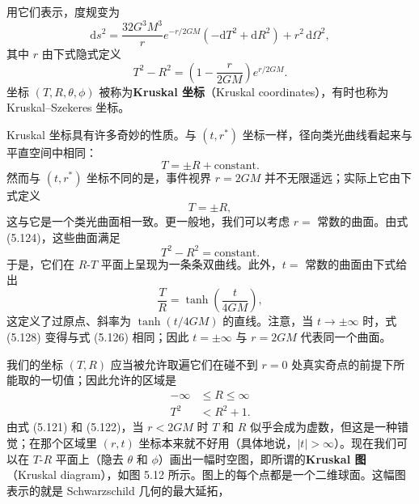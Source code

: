 用它们表示，度规变为
\begin{equation*}
\boxed{\,\mathrm{d}s^2 = \frac{32G^3M^3}{r}e^{-r/2GM}\left(-\mathrm{d}T^2 + \mathrm{d}R^2\right) + r^2\,\mathrm{d}\Omega^2,\,}
\tag{5.123}
\end{equation*}
其中 $r$ 由下式隐式定义
\begin{equation*}
T^2 - R^2 = \left(1 - \frac{r}{2GM}\right)e^{r/2GM}.
\tag{5.124}
\end{equation*}
坐标 $(T, R, \theta, \phi)$ 被称为\textbf{Kruskal 坐标}（Kruskal coordinates），有时也称为 Kruskal--Szekeres 坐标。

Kruskal 坐标具有许多奇妙的性质。与 $(t, r^*)$ 坐标一样，径向类光曲线看起来与平直空间中相同：
\begin{equation*}
T = \pm R + \text{constant}.
\tag{5.125}
\end{equation*}
然而与 $(t, r^*)$ 坐标不同的是，事件视界 $r = 2GM$ 并不无限遥远；实际上它由下式定义
\begin{equation*}
T = \pm R,
\tag{5.126}
\end{equation*}
这与它是一个类光曲面相一致。更一般地，我们可以考虑 $r =$ 常数的曲面。由式 (5.124)，这些曲面满足
\begin{equation*}
T^2 - R^2 = \text{constant}.
\tag{5.127}
\end{equation*}
于是，它们在 $R$-$T$ 平面上呈现为一条条双曲线。此外，$t =$ 常数的曲面由下式给出
\begin{equation*}
\frac{T}{R} = \tanh\left(\frac{t}{4GM}\right),
\tag{5.128}
\end{equation*}
这定义了过原点、斜率为 $\tanh(t/4GM)$ 的直线。注意，当 $t \to \pm\infty$ 时，式 (5.128) 变得与式 (5.126) 相同；因此 $t = \pm\infty$ 与 $r = 2GM$ 代表同一个曲面。

我们的坐标 $(T, R)$ 应当被允许取遍它们在碰不到 $r = 0$ 处真实奇点的前提下所能取的一切值；因此允许的区域是
\begin{align*}
-\infty &\leq R \leq \infty\\
T^2 &< R^2 + 1.
\tag{5.129}
\end{align*}
由式 (5.121) 和 (5.122)，当 $r < 2GM$ 时 $T$ 和 $R$ 似乎会成为虚数，但这是一种错觉；在那个区域里 $(r, t)$ 坐标本来就不好用（具体地说，$|t| > \infty$）。现在我们可以在 $T$-$R$ 平面上（隐去 $\theta$ 和 $\phi$）画出一幅时空图，即所谓的\textbf{Kruskal 图}（Kruskal diagram），如图 5.12 所示。图上的每个点都是一个二维球面。这幅图表示的就是 Schwarzschild 几何的最大延拓，


